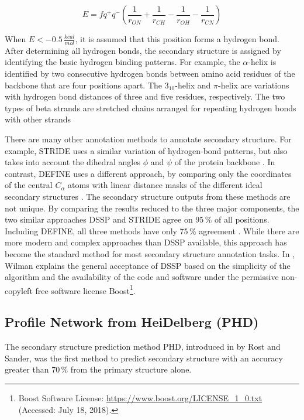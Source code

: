 \begin{equation}
E = fq^{+} q^{-}( \frac{1}{r_{ON}} + \frac{1}{r_{CH}} - \frac{1}{r_{OH}} - \frac{1}{r_{CN}})
\label{eq:dssp}
\end{equation}

When $E < -0.5\,\frac{kcal}{mol}$, it is assumed that this position forms a hydrogen bond. After determining  all hydrogen bonds, the secondary structure is assigned by identifying the basic hydrogen binding patterns. For example, the $\alpha$-helix is identified by two consecutive hydrogen bonds between amino acid residues of the backbone that are four positions  apart. 
The $3_{10}$-helix and $\pi$-helix are variations with hydrogen bond distances of three and five residues, respectively.  
The two types of beta strands are stretched chains arranged for repeating hydrogen bonds with other strands

There are many other annotation methods to annotate secondary structure. 
For example, STRIDE uses a similar variation of hydrogen-bond patterns, but also takes into account the dihedral angles $\phi$ and $\psi$ of the protein backbone \cite{Frishman.1995}.
In contrast, DEFINE uses a  different approach, by comparing only the coordinates of the central $C_\alpha$ atoms with linear distance masks of the different ideal secondary structures \cite{Richards.1988}. 
The secondary structure outputs from these methods are not unique. By comparing the results reduced to the three major components, the two similar approaches \ac{DSSP} and STRIDE agree on 95\,\% of all positions. Including DEFINE, all three methods have only  75\,\% agreement  \cite{Cuff.1999}. 
While there are more modern and complex approaches than \ac{DSSP} available, this approach has become the standard method for most secondary structure annotation tasks. In \cite{Wilman.2014}, Wilman explains the general acceptance of \ac{DSSP} based on the simplicity of the algorithm and the availability of the code and software under the permissive non-copyleft free software license  Boost\footnote{Boost Software License: \url{https://www.boost.org/LICENSE_1_0.txt} (Accessed: July 18, 2018).}. 


\subsection{Profile Network from HeiDelberg (PHD)}


The secondary structure prediction method \acf{PHD}, introduced in \cite{Rost.1993b} by Rost and Sander, was the first method to predict secondary structure with an accuracy greater than 70\,\% from the primary structure alone.  

